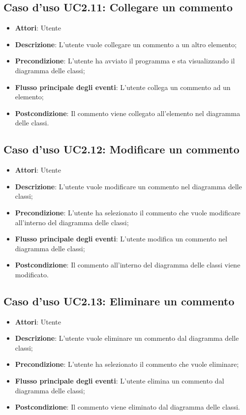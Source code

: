 \documentclass[../AnalisiDeiRequisiti.tex]{subfiles}
\begin{document}
		\subsection{Caso d'uso UC2.11: Collegare un commento}
		\begin{itemize}
			\item \textbf{Attori}: Utente
			\item \textbf{Descrizione}: L'utente vuole collegare un commento a un altro elemento;
			\item \textbf{Precondizione}: L'utente ha avviato il programma e sta visualizzando il diagramma delle classi;
			\item \textbf{Flusso principale degli eventi}: L'utente collega un commento ad un elemento;
			\item \textbf{Postcondizione}: Il commento viene collegato all'elemento nel diagramma delle classi.
		\end{itemize}
		\subsection{Caso d'uso UC2.12: Modificare un commento}
		\begin{itemize}
			\item \textbf{Attori}: Utente
			\item \textbf{Descrizione}: L'utente vuole modificare un commento nel diagramma delle classi;
			\item \textbf{Precondizione}: L'utente ha selezionato il commento che vuole modificare all'interno del diagramma delle classi;
			\item \textbf{Flusso principale degli eventi}: L'utente modifica un commento nel diagramma delle classi;
			\item \textbf{Postcondizione}: Il commento all'interno del diagramma delle classi viene modificato.
		\end{itemize}
		\subsection{Caso d'uso UC2.13: Eliminare un commento}
		\begin{itemize}
			\item \textbf{Attori}: Utente
			\item \textbf{Descrizione}: L'utente vuole eliminare un commento dal diagramma delle classi;
			\item \textbf{Precondizione}: L'utente ha selezionato il commento che vuole eliminare;
			\item \textbf{Flusso principale degli eventi}: L'utente elimina un commento dal diagramma delle classi;
			\item \textbf{Postcondizione}: Il commento viene eliminato dal diagramma delle classi.
		\end{itemize}
\end{document}
